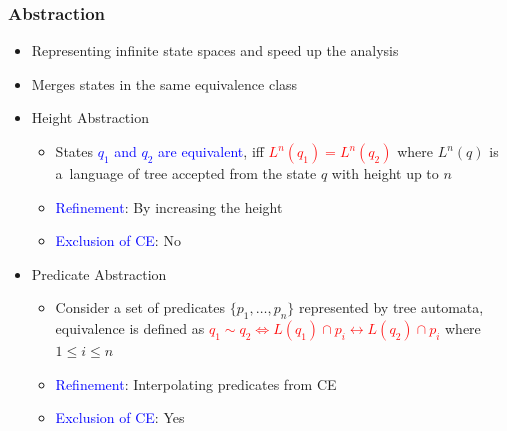 \documentclass{beamer}
\newcommand{\hlbl}[1]{\textcolor{blue}{#1}}
\newcommand{\hlgr}[1]{\textcolor{olive!50!green}{#1}}
\newcommand{\hlrd}[1]{\textcolor{red}{#1}}
\begin{document}


\begin{frame}
\frametitle{Abstraction}

	\begin{itemize}
		\item Representing infinite state spaces and speed up the analysis
		\item Merges states in the same equivalence class
		\item \hlgr{Height Abstraction}
		\begin{itemize}
			\item States \hlbl{$q_1$ and $q_2$ are equivalent},
				iff \hlrd{$L^n(q_1) = L^n(q_2)$} where $L^n(q)$ is
				a~language of tree accepted from the state $q$ with height up to $n$
			\item \hlbl{Refinement}: By increasing the height
			\item \hlbl{Exclusion of CE}: No
		\end{itemize}

	    \item \hlgr{Predicate Abstraction}
		\begin{itemize}
			\item Consider a set of predicates $\{p_1,\ldots,p_n\}$ represented by tree automata,
				equivalence is defined as \hlrd{$q_1 \sim q_2 \Leftrightarrow L(q_1) \cap p_i \leftrightarrow L(q_2) \cap p_i$}
				where $1 \leq i \leq n$
			\item \hlbl{Refinement}: Interpolating predicates from CE
			\item \hlbl{Exclusion of CE}: Yes
		\end{itemize}
	\end{itemize}


\end{frame}

\end{document}
